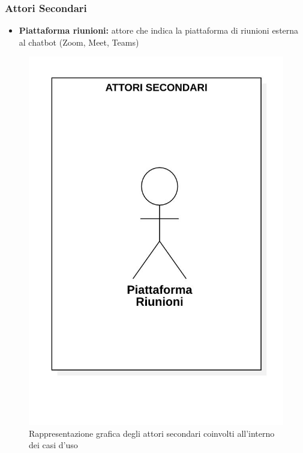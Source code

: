 \subsubsection{Attori Secondari}
\begin{itemize}
    \item \textbf{Piattaforma riunioni:} attore che indica la piattaforma di riunioni esterna al chatbot (Zoom, Meet, Teams)
\end{itemize}
\begin{figure}[H]
    \centering
    \includegraphics[scale=0.35]{images/attori_secondari.jpg} 
    \caption{Rappresentazione grafica degli attori secondari coinvolti all'interno dei casi d'uso}
\end{figure}
\newpage